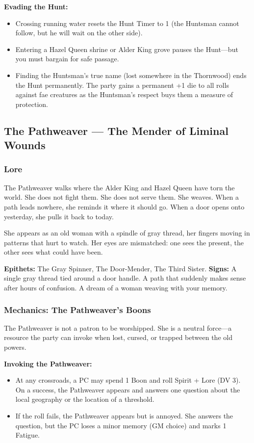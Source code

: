 \documentclass[11pt]{article}
\begin{document}
\textbf{Evading the Hunt:}
\begin{itemize}
\item Crossing running water resets the Hunt Timer to 1 (the Huntsman cannot follow, but he will wait on the other side).
\item Entering a Hazel Queen shrine or Alder King grove pauses the Hunt---but you must bargain for safe passage.
\item Finding the Huntsman's true name (lost somewhere in the Thornwood) ends the Hunt permanently. The party gains a permanent +1 die to all rolls against fae creatures as the Huntsman's respect buys them a measure of protection.
\end{itemize}

\subsection{The Pathweaver --- The Mender of Liminal Wounds}

\subsubsection{Lore}

The Pathweaver walks where the Alder King and Hazel Queen have torn the world. She does not fight them. She does not serve them. She weaves. When a path leads nowhere, she reminds it where it should go. When a door opens onto yesterday, she pulls it back to today.

She appears as an old woman with a spindle of gray thread, her fingers moving in patterns that hurt to watch. Her eyes are mismatched: one sees the present, the other sees what could have been.

\textbf{Epithets:} The Gray Spinner, The Door-Mender, The Third Sister.
\textbf{Signs:} A single gray thread tied around a door handle. A path that suddenly makes sense after hours of confusion. A dream of a woman weaving with your memory.

\subsubsection{Mechanics: The Pathweaver's Boons}

The Pathweaver is not a patron to be worshipped. She is a neutral force---a resource the party can invoke when lost, cursed, or trapped between the old powers.

\textbf{Invoking the Pathweaver:}
\begin{itemize}
\item At any crossroads, a PC may spend 1 Boon and roll Spirit + Lore (DV 3). On a success, the Pathweaver appears and answers one question about the local geography or the location of a threshold.
\item If the roll fails, the Pathweaver appears but is annoyed. She answers the question, but the PC loses a minor memory (GM choice) and marks 1 Fatigue.
\end{itemize}
\end{document}
